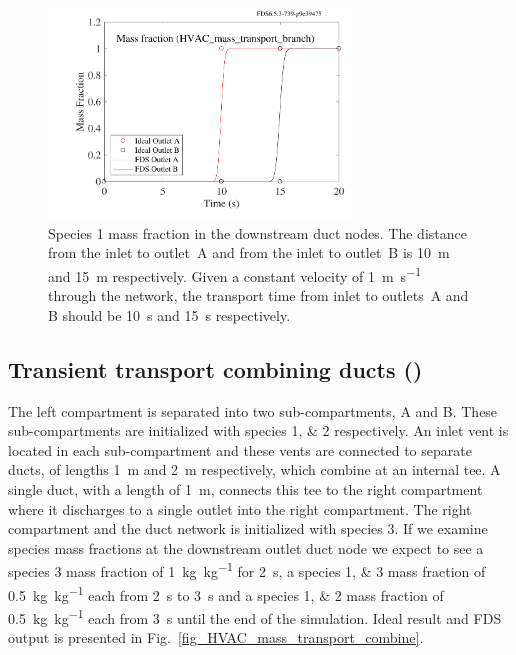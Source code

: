 \documentclass[11pt]{book}
\begin{document}
\begin{figure}[ht]
\centering
\includegraphics[height=2.2in]{SCRIPT_FIGURES/HVAC_mass_transport_branch}
\caption[ test case]{Species \num{1} mass fraction in the downstream duct nodes. The distance from the inlet to outlet~A and from the inlet to outlet~B is \SI{10}{\meter} and \SI{15}{\meter} respectively. Given a constant velocity of \SI[per-mode=symbol]{1}{\meter\per\second} through the network, the transport time from inlet to outlets~A and B should be \SI{10}{\second} and \SI{15}{\second} respectively.}
\label{fig_HVAC_mass_transport_branch}
\end{figure}

\subsection{Transient transport combining ducts (\texorpdfstring{}{HVAC\_mass\_transport\_combine})}
\label{HVAC_mass_transport_combine}
The left compartment is separated into two sub-compartments, A and B. These sub-compartments are initialized with species \numlist{1;2} respectively. An inlet vent is located in each sub-compartment and these vents are connected to separate ducts, of lengths \SI{1}{\meter} and \SI{2}{\meter} respectively, which combine at an internal tee. A single duct, with a length of \SI{1}{\meter}, connects this tee to the right compartment where it discharges to a single outlet into the right compartment. The right compartment and the duct network is initialized with species \num{3}. If we examine species mass fractions at the downstream outlet duct node we expect to see a species \num{3} mass fraction of \SI[per-mode=symbol]{1}{\kilogram\per\kilogram} for \SI{2}{\second}, a species \numlist{1;3} mass fraction of \SI[per-mode=symbol]{0.5}{\kilogram\per\kilogram} each from \SI{2}{\second} to \SI{3}{\second} and a species \numlist{1;2} mass fraction of \SI[per-mode=symbol]{0.5}{\kilogram\per\kilogram} each from \SI{3}{\second} until the end of the simulation. Ideal result and FDS output is presented in Fig.~\ref{fig_HVAC_mass_transport_combine}.
\end{document}
